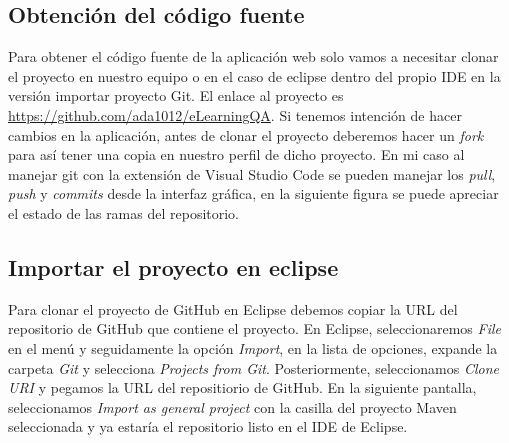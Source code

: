 \subsection{Obtención del código fuente}
Para obtener el código fuente de la aplicación web solo vamos a necesitar clonar el proyecto en nuestro equipo o en el caso de eclipse dentro del propio IDE en la versión importar proyecto Git. El enlace al proyecto es \url{https://github.com/ada1012/eLearningQA}. Si tenemos intención de hacer cambios en la aplicación, antes de clonar el proyecto deberemos hacer un \textit{fork} para así tener una copia en nuestro perfil de dicho proyecto. En mi caso al manejar git con la extensión de Visual Studio Code se pueden manejar los \textit{pull}, \textit{push} y \textit{commits} desde la interfaz gráfica, en la siguiente figura se puede apreciar el estado de las ramas del repositorio.

\subsection{Importar el proyecto en eclipse}
Para clonar el proyecto de GitHub en Eclipse debemos copiar la URL del repositorio de GitHub que contiene el proyecto. En Eclipse, seleccionaremos \textit{File} en el menú y seguidamente la opción \textit{Import}, en la lista de opciones, expande la carpeta \textit{Git} y selecciona \textit{Projects from Git}. Posteriormente, seleccionamos \textit{Clone URI} y pegamos la URL del repositiorio de GitHub. En la siguiente pantalla, seleccionamos \textit{Import as general project} con la casilla del proyecto Maven seleccionada y ya estaría el repositorio listo en el IDE de Eclipse.

